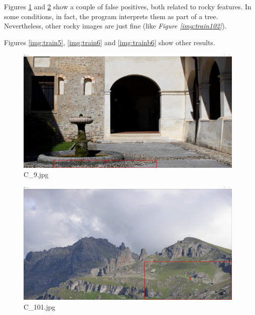 \documentclass{article}
\begin{document}
Figures \ref{img:train9} and \ref{img:train101} show a couple of false positives, both related to rocky features. In some conditions, in fact, the program interprets them as part of a tree.
Nevertheless, other rocky images are just fine (like \textit{Figure \ref{img:train102}}).

Figures \ref{img:train5}, \ref{img:train6} and \ref{img:trainb6} show other results.

\begin{figure}[h]
\begin{center}
\includegraphics[width=1\textwidth]{images/train9}
\caption{\footnotesize{C\_9.jpg}}
\label{img:train9}
\end{center}
\end{figure}

\begin{figure}[h]
\begin{center}
\includegraphics[width=1\textwidth]{images/train101}
\caption{\footnotesize{C\_101.jpg}}
\label{img:train101}
\end{center}
\end{figure}
\end{document}
